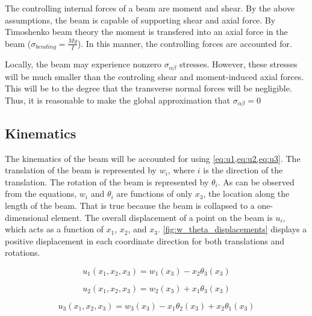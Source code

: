 The controlling internal forces of a beam are moment and shear.
By the above assumptions, the beam is capable of supporting shear and axial force.
By Timoshenko beam theory the moment is transfered into an axial force in the beam ($\sigma_{bending}=\frac{My}{I}$).
In this manner, the controlling forces are accounted for.

Locally, the beam may experience nonzero $\sigma_{\alpha\beta}$ stresses.
However, these stresses will be much smaller than the controling shear and moment-induced axial forces.
This will be to the degree that the transverse normal forces will be negligible. 
Thus, it is reasonable to make the global approximation that $\sigma_{\alpha\beta}=0$





\subsection{Kinematics}
\label{subsec:displacements}
The kinematics of the beam will be accounted for using \cref{eq:u1,eq:u2,eq:u3}.
The translation of the beam is represented by $w_i$, where $i$ is the direction of the translation.
The rotation of the beam is represented by $\theta_i$.
As can be observed from the equations, $w_i$ and $\theta_i$ are functions of only $x_3$, the location along the length of the beam.
That is true because the beam is collapsed to a one-dimensional element.
The overall displacement of a point on the beam is $u_i$, which acts as a function of $x_1$, $x_2$, and $x_3$.
\cref{fig:w_theta_displacements} displays a positive displacement in each coordinate direction for both translations and rotations. 

\begin{equation}
u_1(x_1, x_2, x_3)=w_1(x_3)-x_2\theta_3(x_3)
\label{eq:u1}
\end{equation}

\begin{equation}
u_2(x_1, x_2, x_3)=w_2(x_3)+x_1\theta_3(x_3)
\label{eq:u2}
\end{equation}

\begin{equation}
u_3(x_1, x_2, x_3)=w_3(x_3)-x_1\theta_2(x_3)+x_2\theta_1(x_3)
\label{eq:u3}
\end{equation}

